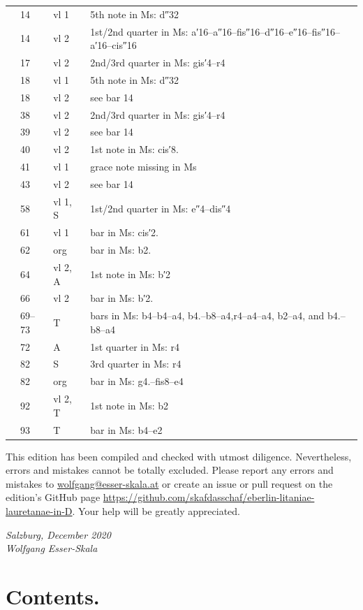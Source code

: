 \documentclass[parskip=full]{scrreprt}
\newif\iftemplate\templatetrue
\begin{document}
\begin{longtable}{lll L{10cm}}
	  & 14  & vl 1    & 5th note in Ms: d″32 \\
	  & 14  & vl 2    & 1st/2nd quarter in Ms: a′16–a″16–fis″16–d″16–e″16–fis″16–a′16–cis″16 \\
	  & 17  & vl 2    & 2nd/3rd quarter in Ms: gis′4–r4 \\
	  & 18  & vl 1    & 5th note in Ms: d″32 \\
	  & 18  & vl 2    & see bar 14 \\
	  & 38  & vl 2    & 2nd/3rd quarter in Ms: gis′4–r4 \\
	  & 39  & vl 2    & see bar 14 \\
	  & 40  & vl 2    & 1st note in Ms: cis′8. \\
	  & 41  & vl 1    & grace note missing in Ms \\
	  & 43  & vl 2    & see bar 14 \\
	  & 58  & vl 1, S & 1st/2nd quarter in Ms: e″4–dis″4 \\
	  & 61  & vl 1    & bar in Ms: cis′2. \\
	  & 62  & org     & bar in Ms: b2. \\
	  & 64  & vl 2, A & 1st note in Ms: b′2 \\
	  & 66  & vl 2    & bar in Ms: b′2. \\
	  & 69–73 & T     & bars in Ms: b4–b4–a4, b4.–b8–a4,\newline r4–a4–a4, b2–a4, and b4.–b8–a4 \\
	  & 72  & A       & 1st quarter in Ms: r4 \\
	  & 82  & S       & 3rd quarter in Ms: r4 \\
	  & 82  & org     & bar in Ms: g4.–fis8–e4 \\
	  & 92  & vl 2, T & 1st note in Ms: b2 \\
	  & 93  & T       & bar in Ms: b4–e2 \\
	\bottomrule
\end{longtable}


This edition has been compiled and checked with utmost diligence. Nevertheless, errors and mistakes cannot be totally excluded. Please report any errors and mistakes to \url{wolfgang@esser-skala.at} or create an issue or pull request on the edition’s GitHub page \url{https://github.com/skafdasschaf/eberlin-litaniae-lauretanae-in-D}. Your help will be greatly appreciated.

\bigskip
\textit{Salzburg, December 2020\\
Wolfgang Esser-Skala}

\cleardoublepage
\chapter*{Contents.}


\cleardoublepage
\fi

\iftemplate

\fi
\end{document}
